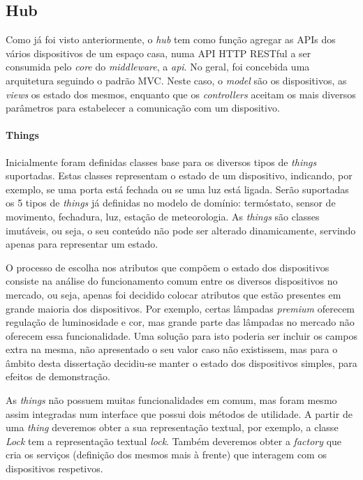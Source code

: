 
\subsection{Hub}

Como já foi visto anteriormente, o \textit{hub} tem como função agregar as APIs dos vários dispositivos de um espaço casa, numa API HTTP RESTful a ser consumida pelo \textit{core} do \textit{middleware}, a \textit{api}. No geral, foi concebida uma arquitetura seguindo o padrão MVC. Neste caso, o \textit{model} são os dispositivos, as \textit{views} os estado dos mesmos, enquanto que os \textit{controllers} aceitam os mais diversos parâmetros para estabelecer a comunicação com um dispositivo.

%
%
%
%

\paragraph*{Things}

Inicialmente foram definidas classes base para os diversos tipos de \textit{things} suportadas. Estas classes representam o estado de um dispositivo, indicando, por exemplo, se uma porta está fechada ou se uma luz está ligada. Serão suportadas os 5 tipos de \textit{things} já definidas no modelo de domínio: termóstato, sensor de movimento, fechadura, luz, estação de meteorologia. As \textit{things} são classes imutáveis, ou seja, o seu conteúdo não pode ser alterado dinamicamente, servindo apenas para representar um estado.

O processo de escolha nos atributos que compõem o estado dos dispositivos consiste na análise do funcionamento comum entre os diversos dispositivos no mercado, ou seja, apenas foi decidido colocar atributos que estão presentes em grande maioria dos dispositivos. Por exemplo, certas lâmpadas \textit{premium} oferecem regulação de luminosidade e cor, mas grande parte das lâmpadas no mercado não oferecem essa funcionalidade. Uma solução para isto poderia ser incluir os campos extra na mesma, não apresentado o seu valor caso não existissem, mas para o âmbito desta dissertação decidiu-se manter o estado dos dispositivos simples, para efeitos de demonstração.

As \textit{things} não possuem muitas funcionalidades em comum, mas foram mesmo assim integradas num interface que possui dois métodos de utilidade. A partir de uma \textit{thing} deveremos obter a sua representação textual, por exemplo, a classe \textit{Lock} tem a representação textual \textit{lock}. Também deveremos obter a \textit{factory} que cria os serviços (definição dos mesmos mais à frente) que interagem com os dispositivos respetivos.


